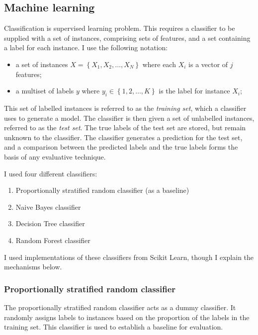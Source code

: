     \subsection{Machine learning}
      Classification is supervised learning problem. This requires a classifier to be supplied with a set of instances, comprising sets of features, and a set containing a label for each instance. I use the following notation:
      \begin{itemize}
        \item a set of instances $X = \left\{X_1, X_2, \dots, X_N\right\}$ where each $X_i$ is a vector of $j$ features;
        \item a multiset of labels $y$ where $y_i \in \left\{1, 2, \dots, K\right\}$ is the label for instance $X_i$;
      \end{itemize}  
      
      This set of labelled instances is referred to as the \emph{training set}, which a classifier uses to generate a model. The classifier is then given a set of unlabelled instances, referred to as the \emph{test set}. The true labels of the test set are stored, but remain unknown to the classifier. The classifier generates a prediction for the test set, and a comparison between the predicted labels and the true labels forms the basis of any evaluative technique.
      
      I used four different classifiers:
      \begin{enumerate}
        \item Proportionally stratified random classifier (as a baseline)
        \item Naive Bayes classifier
        \item Decision Tree classifier
        \item Random Forest classifier
      \end{enumerate}
      
      I used implementations of these classifiers from Scikit Learn, though I explain the mechanisms below.
      
      \subsubsection{Proportionally stratified random classifier}
        The proportionally stratified random classifier acts as a dummy classifier. It randomly assigns labels to instances based on the proportion of the labels in the training set. This classifier is used to establish a baseline for evaluation.
        
